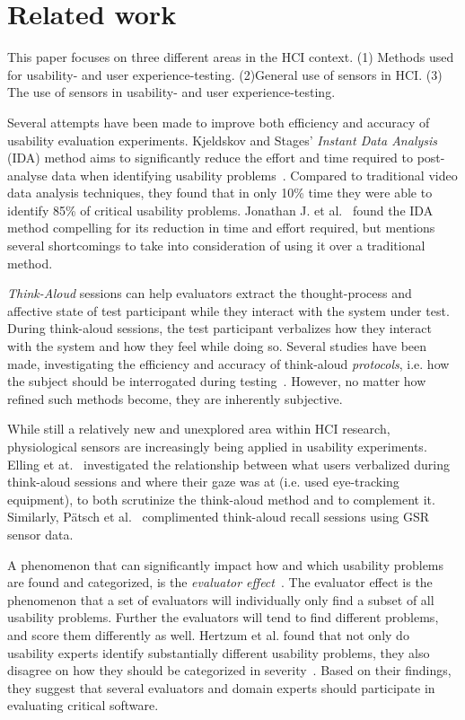 \section{Related work}
This paper focuses on three different areas in the HCI context. (1) Methods used for usability- and user experience-testing. (2)General use of sensors in HCI. (3) The use of sensors in usability- and user experience-testing.

Several attempts have been made to improve both efficiency and accuracy of
usability evaluation experiments. Kjeldskov and Stages' \textit{Instant Data
Analysis} (IDA) method aims to significantly reduce the effort and time required
to post-analyse data when identifying usability
problems~\cite{instant_data_analysis}. Compared to traditional video data
analysis techniques, they found that in only 10\% time they were able to
identify 85\% of critical usability problems. Jonathan J. et
al.~\cite{use_of_TA_and_IDA} found the IDA
method compelling for its reduction in time and effort required, but mentions
several shortcomings to take into consideration of using it over a traditional
method.

\textit{Think-Aloud} sessions can help evaluators extract the thought-process
and affective state of test participant while they interact with the system
under test. During think-aloud sessions, the test participant verbalizes how
they interact with the system and how they feel while doing so.  Several studies
have been made, investigating the efficiency and accuracy of think-aloud
\textit{protocols}, i.e. how the subject should be interrogated during
testing~\cite{two_think_aloud_protocols_study}. However, no matter how refined
such methods become, they are inherently subjective.

While still a relatively new and unexplored area within HCI research,
physiological sensors are increasingly being applied in usability experiments.
Elling et at.~\cite{concurrent_think_aloud_eye_tracking} investigated the
relationship between what users verbalized during think-aloud sessions and where
their gaze was at (i.e. used eye-tracking equipment), to both scrutinize the
think-aloud method and to complement it. Similarly, P\"{a}tsch et
al.~\cite{using_sensor_graphs_think_aloud} complimented think-aloud recall
sessions using GSR sensor data.

A phenomenon that can significantly impact how and which usability problems are
found and categorized, is the \textit{evaluator effect}~\cite{eval_effect}.
The evaluator effect is the phenomenon that a set of evaluators will individually only find a subset of all usability problems.
Further the evaluators will tend to find different problems, and score them differently as well.\cite{eval_effect}
Hertzum et al. found that not only do
usability experts identify substantially different usability problems, they also
disagree on how they should be categorized in
severity~\cite{eval_effect_research}. Based on their findings, they suggest that
several evaluators and domain experts should participate in evaluating critical
software.

